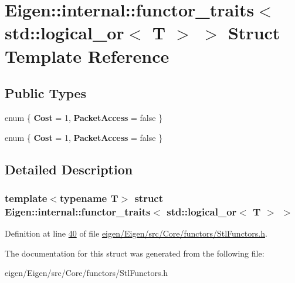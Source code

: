 \hypertarget{struct_eigen_1_1internal_1_1functor__traits_3_01std_1_1logical__or_3_01_t_01_4_01_4}{}\section{Eigen\+:\+:internal\+:\+:functor\+\_\+traits$<$ std\+:\+:logical\+\_\+or$<$ T $>$ $>$ Struct Template Reference}
\label{struct_eigen_1_1internal_1_1functor__traits_3_01std_1_1logical__or_3_01_t_01_4_01_4}
\subsection*{Public Types}
\begin{DoxyCompactItemize}
\item 
\mbox{\label{struct_eigen_1_1internal_1_1functor__traits_3_01std_1_1logical__or_3_01_t_01_4_01_4_a1b75e1c91e628043c36c9d9285e04d40}} 
enum \{ {\bfseries Cost} = 1, 
{\bfseries Packet\+Access} = false
 \}
\item 
\mbox{\label{struct_eigen_1_1internal_1_1functor__traits_3_01std_1_1logical__or_3_01_t_01_4_01_4_abee8607886ee97f0071994701f017ec1}} 
enum \{ {\bfseries Cost} = 1, 
{\bfseries Packet\+Access} = false
 \}
\end{DoxyCompactItemize}


\subsection{Detailed Description}
\subsubsection*{template$<$typename T$>$\newline
struct Eigen\+::internal\+::functor\+\_\+traits$<$ std\+::logical\+\_\+or$<$ T $>$ $>$}



Definition at line \hyperlink{eigen_2_eigen_2src_2_core_2functors_2_stl_functors_8h_source_l00040}{40} of file \hyperlink{eigen_2_eigen_2src_2_core_2functors_2_stl_functors_8h_source}{eigen/\+Eigen/src/\+Core/functors/\+Stl\+Functors.\+h}.



The documentation for this struct was generated from the following file\+:\begin{DoxyCompactItemize}
\item 
eigen/\+Eigen/src/\+Core/functors/\+Stl\+Functors.\+h\end{DoxyCompactItemize}
